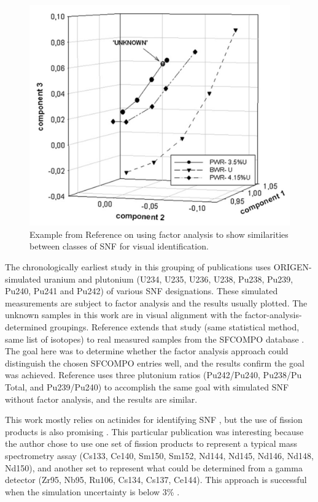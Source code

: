 \begin{figure}[!htb]
  \centering
  \includegraphics[width=0.5\linewidth]{./chapters/litrev/nicolaou.png}
  \caption{Example from Reference \cite{nicolaou_pu} on using factor analysis 
           to show similarities between classes of \gls{SNF} for visual 
           identification.}
  \label{fig:nico}
\end{figure}

The chronologically earliest study in this grouping of publications
\cite{nicolaou_2006} uses \gls{ORIGEN}-simulated uranium and plutonium (U234,
U235, U236, U238, Pu238, Pu239, Pu240, Pu241 and Pu242) of various \gls{SNF}
designations.  These simulated measurements are subject to factor analysis and
the results usually plotted.  The unknown samples in this work are in visual
alignment with the factor-analysis-determined groupings.  Reference
\cite{nicolaou_2014} extends that study (same statistical method, same list of
isotopes) to real measured samples from the \gls{SFCOMPO} database
\cite{sfcompo, valid_sfco}.  The goal here was to determine whether the factor
analysis approach could distinguish the chosen \gls{SFCOMPO} entries well, and
the results confirm the goal was achieved.  Reference \cite{nicolaou_2015} uses
three plutonium ratios (Pu242/Pu240, Pu238/Pu Total, and Pu239/Pu240) to
accomplish the same goal with simulated \gls{SNF} without factor analysis, and
the results are similar. 

This work mostly relies on actinides for identifying \gls{SNF}
\cite{nicolaou_2006, nicolaou_pu, nicolaou_2014, nicolaou_2015}, but the use of
fission products is also promising \cite{nicolaou_2009}.  This particular
publication was interesting because the author chose to use one set of fission
products to represent a typical mass spectrometry assay (Cs133, Ce140, Sm150,
Sm152, Nd144, Nd145, Nd146, Nd148, Nd150), and another set to represent what
could be determined from a gamma detector (Zr95, Nb95, Ru106, Cs134, Cs137,
Ce144).  This approach is successful when the simulation uncertainty is below
3\% \cite{nicolaou_2009}.

